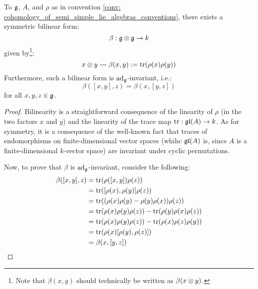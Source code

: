             \begin{proposition} \label{prop: associated_invariant_bilinear_forms_of_lie_algebras}
                To $\mathfrak{g}$, $A$, and $\rho$ as in convention \ref{conv: cohomology_of_semi_simple_lie_algebras_conventions}, there exists a symmetric bilinear form:
                    $$\beta: \g \tensor \g \to k$$
                given by\footnote{Note that $\beta(x, y)$ should technically be written as $\beta(x \tensor y)$.}:
                    $$x \tensor y \mapsto \beta(x, y) := \trace(\rho(x) \rho(y))$$
                Furthermore, such a bilinear form is $\mathrm{ad}_{\mathfrak{g}}$-invariant, i.e.:
                    $$\beta([x, y], z) = \beta(x, [y, z])$$
                for all $x, y, z \in \mathfrak{g}$.
            \end{proposition}
                \begin{proof}
                    Bilinearity is a straightforward consequence of the linearity of $\rho$ (in the two factors $x$ and $y$) and the linearity of the trace map $\operatorname{tr}: \mathfrak{gl}(A) \to k$. As for symmetry, it is a consequence of the well-known fact that traces of endomorphisms on finite-dimensional vector spaces (whihc $\mathfrak{gl}(A)$ is, since $A$ is a finite-dimensional $k$-vector space) are invariant under cyclic permutations.
                    
                    Now, to prove that $\beta$ is $\mathrm{ad}_{\mathfrak{g}}$-invariant, consider the following:
                        $$
                            \begin{aligned}
                                \beta([x, y], z) & = \operatorname{tr}(\rho([x, y]) \rho(z))
                                \\
                                & = \operatorname{tr}([\rho(x), \rho(y)] \rho(z))
                                \\
                                & = \operatorname{tr}((\rho(x)\rho(y) - \rho(y)\rho(x)) \rho(z))
                                \\
                                & = \operatorname{tr}(\rho(x) \rho(y)\rho(z)) - \operatorname{tr}(\rho(y)\rho(x)\rho(z))
                                \\
                                & = \operatorname{tr}(\rho(x) \rho(y)\rho(z)) - \operatorname{tr}(\rho(x)\rho(z)\rho(y))
                                \\
                                & = \operatorname{tr}(\rho(x)[\rho(y), \rho(z)])
                                \\
                                & = \beta(x, [y, z])
                            \end{aligned}
                        $$
                \end{proof}
